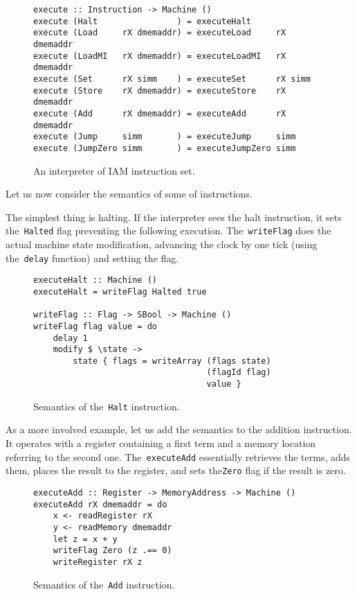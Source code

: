 \begin{figure}[H]
\begin{verbatim}
execute :: Instruction -> Machine ()
execute (Halt                ) = executeHalt
execute (Load     rX dmemaddr) = executeLoad     rX dmemaddr
execute (LoadMI   rX dmemaddr) = executeLoadMI   rX dmemaddr
execute (Set      rX simm    ) = executeSet      rX simm
execute (Store    rX dmemaddr) = executeStore    rX dmemaddr
execute (Add      rX dmemaddr) = executeAdd      rX dmemaddr
execute (Jump     simm       ) = executeJump     simm
execute (JumpZero simm       ) = executeJumpZero simm
\end{verbatim}
\caption{An interpreter of IAM instruction set.}
\label{execute}
\end{figure}

Let us now consider the semantics of some of instructions.

The simplest thing is halting. If the interpreter sees the halt instruction, it
sets the~\texttt{Halted} flag preventing the following execution.
The~\texttt{writeFlag} does the actual machine state modification,
advancing the clock by one tick (using the~\texttt{delay} function)
and setting the flag.

\begin{figure}[H]
\begin{verbatim}
executeHalt :: Machine ()
executeHalt = writeFlag Halted true

writeFlag :: Flag -> SBool -> Machine ()
writeFlag flag value = do
    delay 1
    modify $ \state ->
        state { flags = writeArray (flags state)
                                   (flagId flag)
                                   value }
\end{verbatim}
\caption{Semantics of the~\texttt{Halt} instruction.}
\label{haltSemantics}
\end{figure}

As a more involved example, let us add the semantics to the addition instruction.
It operates with a register containing a first term and a memory location referring
to the second one. The~\texttt{executeAdd} essentially retrieves the terms,
adds them, places the result to the register, and sets the\texttt{Zero}
flag if the result is zero.

\begin{figure}[H]
\begin{verbatim}
executeAdd :: Register -> MemoryAddress -> Machine ()
executeAdd rX dmemaddr = do
    x <- readRegister rX
    y <- readMemory dmemaddr
    let z = x + y
    writeFlag Zero (z .== 0)
    writeRegister rX z
\end{verbatim}
\caption{Semantics of the~\texttt{Add} instruction.}
\label{addSemantics}
\end{figure}


